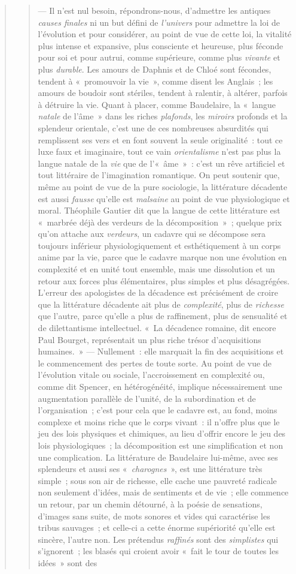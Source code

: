 \documentclass[french,twoside]{book} %
\begin{document}
\begin{verse}
\begin{verse}
\noindent — Il n’est nul besoin, répondrons-nous, d’admettre les antiques \emph{causes finales} ni un but défini de \emph{l’univers} pour admettre la loi de l’évolution et pour considérer, au point de vue de cette loi, la vitalité plus intense et expansive, plus consciente et heureuse, plus féconde pour soi et pour autrui, comme supérieure, comme plus \emph{vivante} et plus \emph{durable}. Les amours de Daphnis et de Chloé sont fécondes, tendent à « promouvoir la vie », comme disent les Anglais ; les amours de boudoir sont stériles, tendent à ralentir, à altérer, parfois à détruire la vie. Quant à placer, comme Baudelaire, la « langue \emph{natale} de l’âme » dans les riches \emph{plafonds}, les \emph{miroirs} profonds et la splendeur orientale, c’est une de ces nombreuses absurdités qui remplissent ses vers et en font souvent la seule originalité : tout ce luxe faux et imaginaire, tout ce vain \emph{orientalisme} n’est pas plus la langue natale de la \emph{vie} que de l’« âme » : c’est un rêve artificiel et tout littéraire de l’imagination romantique. On peut soutenir que, même au point de vue de la pure sociologie, la littérature décadente est aussi \emph{fausse} qu’elle est \emph{malsaine} au point de vue physiologique et moral. Théophile Gautier dit que la langue de cette littérature est « marbrée déjà des verdeurs de la décomposition » ; quelque prix qu’on attache aux \emph{verdeurs}, un cadavre qui se décompose sera toujours inférieur physiologiquement et esthétiquement à un corps anime par la vie, parce que le cadavre marque non une évolution en complexité et en unité tout ensemble, mais une dissolution et un retour aux forces plus élémentaires, plus simples et plus désagrégées. L’erreur des apologistes de la décadence est précisément de croire que la littérature décadente ait plus de \emph{complexité}, plus de \emph{richesse} que l’autre, parce qu’elle a plus de raffinement, plus de sensualité et de dilettantisme intellectuel. « La décadence romaine, dit encore Paul Bourget, représentait un plus riche trésor d’acquisitions humaines. » — Nullement : elle marquait la fin des acquisitions et le commencement des pertes de toute sorte. Au point de vue de l’évolution vitale ou sociale, l’accroissement en complexité ou, comme dit Spencer, en hétérogénéité, implique nécessairement une augmentation parallèle de l’unité, de la subordination et de l’organisation ; c’est pour cela que le cadavre est, au fond, moins complexe et moins riche que le corps vivant : il n’offre plus que le jeu des lois physiques et chimiques, au lieu d’offrir encore le jeu des lois physiologiques ; la décomposition est une simplification et non une complication. La littérature de Baudelaire lui-même, avec ses splendeurs et aussi ses « \emph{charognes} », est une littérature très simple ; sous son air de richesse, elle cache une pauvreté radicale non seulement d’idées, mais de sentiments et de vie ; elle commence un retour, par un chemin détourné, à la poésie de sensations, d’images sans suite, de mots sonores et vides qui caractérise les tribus sauvages ; et celle-ci a cette énorme supériorité qu’elle est sincère, l’autre non. Les prétendus \emph{raffinés} sont des \emph{simplistes} qui s’ignorent ; les blasés qui croient avoir « fait le tour de toutes les idées » sont des 
\end{verse}
\end{verse}
\end{document}
